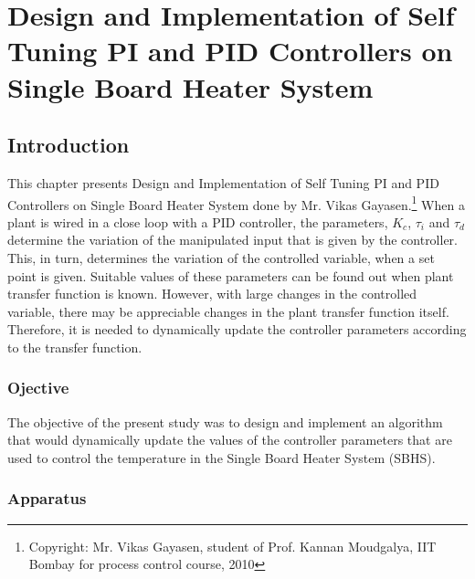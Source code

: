 
\chapter{Design and Implementation of Self Tuning PI and PID Controllers on Single Board Heater System}

\section{Introduction}%
This chapter presents Design and Implementation of Self Tuning PI and PID Controllers on Single Board Heater System done by Mr. Vikas Gayasen.\footnote{Copyright: Mr. Vikas Gayasen, student of Prof. Kannan Moudgalya, IIT Bombay for process control course, 2010}
When a plant is wired in a close loop with a PID controller, the parameters, $K_c$, $\tau_i$ and $\tau_d$ determine the variation of the manipulated input that is given by the controller. This, in turn, determines the variation of the controlled variable, when a set point is given. Suitable values of these parameters can be found out when plant transfer function is known. However, with large changes in the controlled variable, there may be appreciable changes in the plant transfer function itself. Therefore, it is needed to dynamically update the controller parameters according to the transfer function.

\subsection{Ojective}%
The objective of the present study was to design and implement an algorithm that would dynamically update the values of the controller parameters that are used to control the temperature in the Single Board Heater System (SBHS).
\subsection{Apparatus}%

